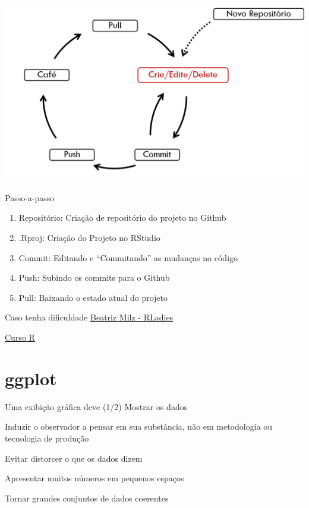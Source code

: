 \documentclass[
  9pt,
  ignorenonframetext,
]{beamer}
\begin{document}
\begin{frame}{}
\protect\hypertarget{section-1}{}
\begin{center}\includegraphics[width=0.8\linewidth]{imgs/fluxo_github_rstudio} \end{center}
\end{frame}

\begin{frame}{Passo-a-passo}
\protect\hypertarget{passo-a-passo}{}
\begin{enumerate}
\item
  Repositório: Criação de repositório do projeto no Github
\item
  .Rproj: Criação do Projeto no RStudio
\item
  Commit: Editando e ``Commitando'' as mudanças no código
\item
  Push: Subindo os commits para o Github
\item
  Pull: Baixando o estado atual do projeto
\end{enumerate}
\end{frame}

\begin{frame}{Caso tenha dificuldade}
\protect\hypertarget{caso-tenha-dificuldade}{}
\href{https://beatrizmilz.github.io/RLadies-Git-RStudio-2019/\#1}{Beatriz
Milz - RLadies}

\href{https://www.curso-r.com/blog/2017-07-17-rstudio-e-github/}{Curso
R}
\end{frame}

\hypertarget{ggplot}{%
\section{ggplot}\label{ggplot}}

\begin{frame}{Uma exibição gráfica deve (1/2)}
\protect\hypertarget{uma-exibiuxe7uxe3o-gruxe1fica-deve-12}{}
Mostrar os dados

Induzir o observador a pensar em sua substância, não em metodologia ou
tecnologia de produção

Evitar distorcer o que os dados dizem

Apresentar muitos números em pequenos espaços

Tornar grandes conjuntos de dados coerentes
\end{frame}
\end{document}
